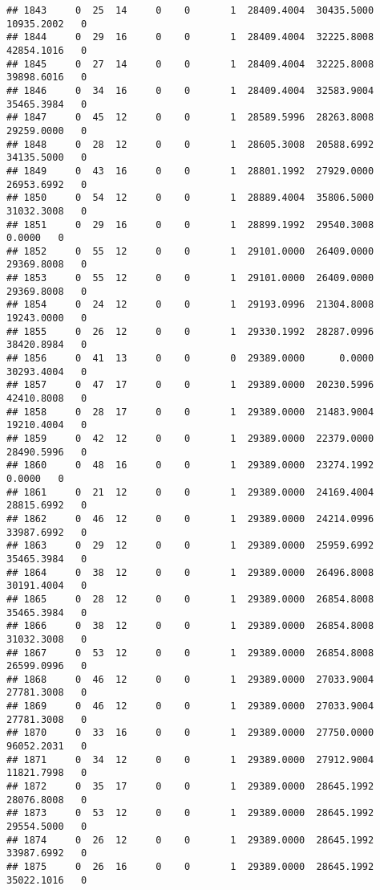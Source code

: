 \documentclass[
]{article}
\begin{document}
\begin{enumerate}
\begin{verbatim}
## 1843     0  25  14     0    0       1  28409.4004  30435.5000  10935.2002   0
## 1844     0  29  16     0    0       1  28409.4004  32225.8008  42854.1016   0
## 1845     0  27  14     0    0       1  28409.4004  32225.8008  39898.6016   0
## 1846     0  34  16     0    0       1  28409.4004  32583.9004  35465.3984   0
## 1847     0  45  12     0    0       1  28589.5996  28263.8008  29259.0000   0
## 1848     0  28  12     0    0       1  28605.3008  20588.6992  34135.5000   0
## 1849     0  43  16     0    0       1  28801.1992  27929.0000  26953.6992   0
## 1850     0  54  12     0    0       1  28889.4004  35806.5000  31032.3008   0
## 1851     0  29  16     0    0       1  28899.1992  29540.3008      0.0000   0
## 1852     0  55  12     0    0       1  29101.0000  26409.0000  29369.8008   0
## 1853     0  55  12     0    0       1  29101.0000  26409.0000  29369.8008   0
## 1854     0  24  12     0    0       1  29193.0996  21304.8008  19243.0000   0
## 1855     0  26  12     0    0       1  29330.1992  28287.0996  38420.8984   0
## 1856     0  41  13     0    0       0  29389.0000      0.0000  30293.4004   0
## 1857     0  47  17     0    0       1  29389.0000  20230.5996  42410.8008   0
## 1858     0  28  17     0    0       1  29389.0000  21483.9004  19210.4004   0
## 1859     0  42  12     0    0       1  29389.0000  22379.0000  28490.5996   0
## 1860     0  48  16     0    0       1  29389.0000  23274.1992      0.0000   0
## 1861     0  21  12     0    0       1  29389.0000  24169.4004  28815.6992   0
## 1862     0  46  12     0    0       1  29389.0000  24214.0996  33987.6992   0
## 1863     0  29  12     0    0       1  29389.0000  25959.6992  35465.3984   0
## 1864     0  38  12     0    0       1  29389.0000  26496.8008  30191.4004   0
## 1865     0  28  12     0    0       1  29389.0000  26854.8008  35465.3984   0
## 1866     0  38  12     0    0       1  29389.0000  26854.8008  31032.3008   0
## 1867     0  53  12     0    0       1  29389.0000  26854.8008  26599.0996   0
## 1868     0  46  12     0    0       1  29389.0000  27033.9004  27781.3008   0
## 1869     0  46  12     0    0       1  29389.0000  27033.9004  27781.3008   0
## 1870     0  33  16     0    0       1  29389.0000  27750.0000  96052.2031   0
## 1871     0  34  12     0    0       1  29389.0000  27912.9004  11821.7998   0
## 1872     0  35  17     0    0       1  29389.0000  28645.1992  28076.8008   0
## 1873     0  53  12     0    0       1  29389.0000  28645.1992  29554.5000   0
## 1874     0  26  12     0    0       1  29389.0000  28645.1992  33987.6992   0
## 1875     0  26  16     0    0       1  29389.0000  28645.1992  35022.1016   0

\end{verbatim}
\end{enumerate}
\end{document}
